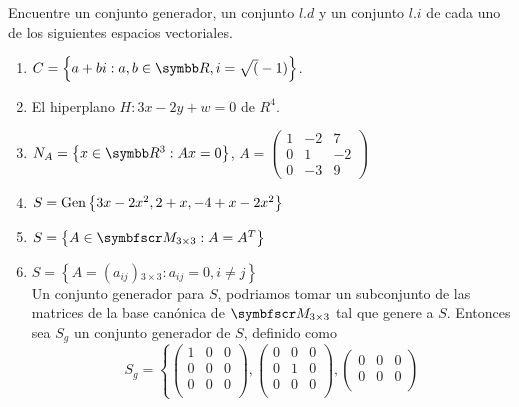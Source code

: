 \item Encuentre un conjunto generador, un conjunto \(l.d\) y un conjunto \(l.i\) de cada uno de los siguientes espacios vectoriales.
    \begin{enumerate}[label=\listAlph]
        \item \(C = \left\{a + bi: a,b \in \realR, i = \sqrt(-1)\right\}\).
        \item El hiperplano \(H: 3x - 2y + w = 0\) de \(R^4\).
        \item \(N_A = \left\{x \in \realR^3: Ax = 0\right\}\), 
            \(
                A = \left(\begin{smallmatrix}
                    1 & -2 & 7 \\
                    0 & 1 & -2 \\
                    0 & -3 & 9
                \end{smallmatrix}\right)
            \)
        \item \(S = \text{Gen} \left\{ 3x - 2x^2, 2 + x, -4 + x - 2x^2 \right\}\)
        \item \(S = \left\{A \in \fm_{3 \times 3}: A = A^T\right\}\)
        \item \(S = \left\{A = \left(a_{ij}\right){}_{3 \times 3}: a_{ij} = 0, i \neq j\right\}\) \\
            Un conjunto generador para \(S\), podriamos tomar un subconjunto de las matrices de la base canónica de \(\fm_{3 \times 3}\)
            tal que genere a \(S\). Entonces sea \(S_g\) un conjunto generador de \(S\), definido como
            \[
                S_g =
                \left\{
                    \begin{pmatrix}
                        1 & 0 & 0 \\
                        0 & 0 & 0 \\
                        0 & 0 & 0 \\
                    \end{pmatrix},
                    \begin{pmatrix}
                        0 & 0 & 0 \\
                        0 & 1 & 0 \\
                        0 & 0 & 0 \\
                    \end{pmatrix},
                    \begin{pmatrix}
                        0 & 0 & 0 \\
                        0 & 0 & 0 \\

\end{pmatrix}\]
\end{enumerate}
